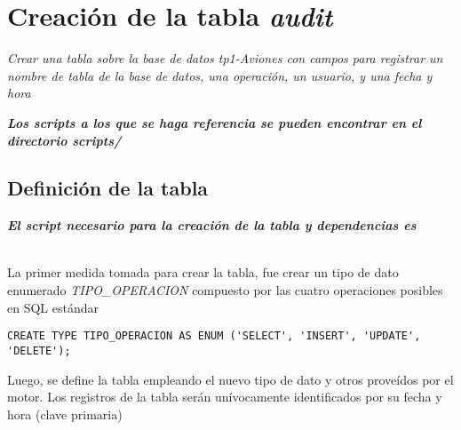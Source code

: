







\clearpage
\tableofcontents
\clearpage


\section{Creación de la tabla \emph{audit}}

\emph{Crear una tabla  sobre la base de datos \emph{tp1-Aviones} con campos para registrar un nombre de tabla de la base de datos, una operación, un usuario, y una fecha y hora} 

\emph{\textbf{Los scripts a los que se haga referencia se pueden encontrar en el directorio scripts/}} 

\subsection{Definición de la tabla}

\emph{\textbf{El script necesario para la creación de la tabla y dependencias es \\ }} 

~\\

La primer medida tomada para crear la tabla, fue crear un tipo de dato enumerado \emph{TIPO\_OPERACION} compuesto por las cuatro operaciones posibles en SQL estándar 

\vspace*{5mm}
\lstset{style=sql}
\begin{lstlisting}
CREATE TYPE TIPO_OPERACION AS ENUM ('SELECT', 'INSERT', 'UPDATE', 'DELETE');
\end{lstlisting}

Luego, se define la tabla empleando el nuevo tipo de dato y otros proveídos por el motor. Los registros de la tabla serán unívocamente identificados por su fecha y hora (clave primaria)

